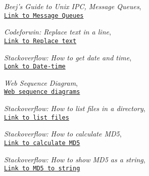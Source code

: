 \documentclass[12pt,a4paper]{article}
\begin{document}
\newpage
\begin{thebibliography}{9}
\emph{Beej's Guide to Unix IPC, Message Queues},
\\\texttt{\href{https://beej.us/guide/bgipc/html/multi/mq.html}{Link to Message Queues}}


\emph{Codeforwin: Replace text in a line},
\\\texttt{\href{https://codeforwin.org/2018/02/c-program-replace-specific-line-a-text-file.html}
{Link to Replace text}}


\emph{Stackoverflow: How to get date and time},
\\\texttt{\href{https://stackoverflow.com/questions/1442116/how-to-get-the-date-and-time-values-in-a-c-program}
{Lonk to Date-time}}

\emph{Web Sequence Diagram},
\\\texttt{\href{https://www.websequencediagrams.com/}{Web sequence diagrams}}

\emph{Stackoverflow: How to list files in a directory},
\\\texttt{\href{https://stackoverflow.com/questions/4204666/how-to-list-files-in-a-directory-in-a-c-program}{Link to list files}}

\emph{Stackoverflow: How to calculate MD5},
\\\texttt{\href{https://stackoverflow.com/questions/10324611/how-to-calculate-the-md5-hash-of-a-large-file-in-c}{Link to calculate MD5}}

\emph{Stackoverflow: How to show MD5 as a string},
\\\texttt{\href{https://stackoverflow.com/questions/7627723/how-to-create-a-md5-hash-of-a-string-in-c}{Link to MD5 to string}}
\end{thebibliography}
\end{document}
